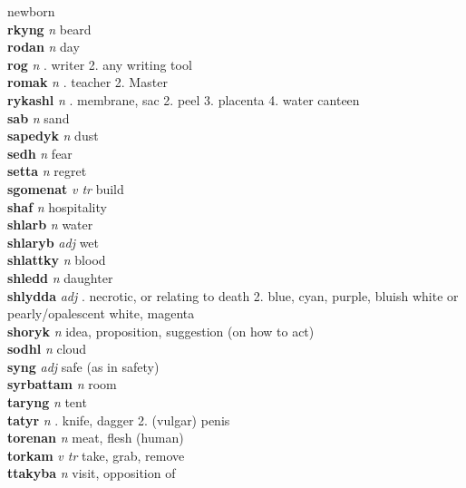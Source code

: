 newborn\\\textbf{rkyng}   \emph{n} \textperiodcentered beard\\\textbf{rodan}   \emph{n} \textperiodcentered day\\\textbf{rog}   \emph{n} . writer 2. any writing tool \\\textbf{romak}   \emph{n} . teacher 2. Master \\\textbf{rykashl}   \emph{n} . membrane, sac 2. peel 3. placenta 4. water canteen \\\textbf{sab}   \emph{n} \textperiodcentered sand\\\textbf{sapedyk}   \emph{n} \textperiodcentered dust\\\textbf{sedh}   \emph{n} \textperiodcentered fear\\\textbf{setta}   \emph{n} \textperiodcentered regret\\\textbf{sgomenat}   \emph{v tr} \textperiodcentered build\\\textbf{shaf}   \emph{n} \textperiodcentered hospitality\\\textbf{shlarb}   \emph{n} \textperiodcentered water\\\textbf{shlaryb}   \emph{adj} \textperiodcentered wet\\\textbf{shlattky}   \emph{n} \textperiodcentered blood\\\textbf{shledd}   \emph{n} \textperiodcentered daughter\\\textbf{shlydda}   \emph{adj} . necrotic, or relating to death 2. blue, cyan, purple, bluish white or pearly/opalescent white, magenta \\\textbf{shoryk}   \emph{n} \textperiodcentered idea, proposition, suggestion (on how to act)\\\textbf{sodhl}   \emph{n} \textperiodcentered cloud\\\textbf{syng}   \emph{adj} \textperiodcentered safe (as in safety)\\\textbf{syrbattam}   \emph{n} \textperiodcentered room\\\textbf{taryng}   \emph{n} \textperiodcentered tent\\\textbf{tatyr}   \emph{n} . knife, dagger 2. (vulgar) penis \\\textbf{torenan}   \emph{n} \textperiodcentered meat, flesh (human)\\\textbf{torkam}   \emph{v tr} \textperiodcentered take, grab, remove\\\textbf{ttakyba}   \emph{n} \textperiodcentered visit, opposition of 